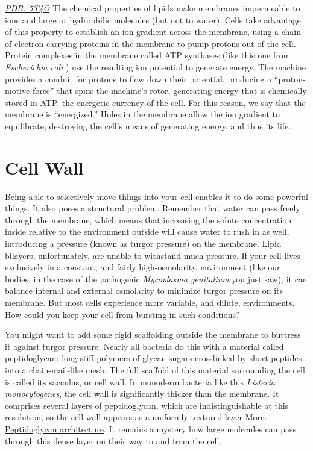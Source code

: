 \documentclass[]{tufte-book}
\begin{document}
\href{http://rcsb.org/structure/5T4O}{\emph{PDB: 5T4O}} The chemical
properties of lipids make membranes impermeable to ions and large or
hydrophilic molecules (but not to water). Cells take advantage of this
property to establish an ion gradient across the membrane, using a chain
of electron-carrying proteins in the membrane to pump protons out of the
cell. Protein complexes in the membrane called ATP synthases (like this
one from \emph{Escherichia coli} \citep{sobti2016}) use the resulting
ion potential to generate energy. The machine provides a conduit for
protons to flow down their potential, producing a ``proton-motive
force'' that spins the machine's rotor, generating energy that is
chemically stored in ATP, the energetic currency of the cell. For this
reason, we say that the membrane is ``energized.'' Holes in the membrane
allow the ion gradient to equilibrate, destroying the cell's means of
generating energy, and thus its life.

\section{Cell Wall}\label{cell-wall}

Being able to selectively move things into your cell enables it to do
some powerful things. It also poses a structural problem. Remember that
water can pass freely through the membrane, which means that increasing
the solute concentration inside relative to the environment outside will
cause water to rush in as well, introducing a pressure (known as turgor
pressure) on the membrane. Lipid bilayers, unfortunately, are unable to
withstand much pressure. If your cell lives exclusively in a constant,
and fairly high-osmolarity, environment (like our bodies, in the case of
the pathogenic \emph{Mycoplasma genitalium} you just saw), it can
balance internal and external osmolarity to minimize turgor pressure on
its membrane. But most cells experience more variable, and dilute,
environments. How could you keep your cell from bursting in such
conditions?

You might want to add some rigid scaffolding outside the membrane to
buttress it against turgor pressure. Nearly all bacteria do this with a
material called peptidoglycan: long stiff polymers of glycan sugars
crosslinked by short peptides into a chain-mail-like mesh. The full
scaffold of this material surrounding the cell is called its sacculus,
or cell wall. In monoderm bacteria like this \emph{Listeria
monocytogenes}, the cell wall is significantly thicker than the
membrane. It comprises several layers of peptidoglycan, which are
indistinguishable at this resolution, so the cell wall appears as a
uniformly textured layer
\protect\hyperlink{Peptidoglycan_architecture}{More: Peptidoglycan
architecture}. It remains a mystery how large molecules can pass through
this dense layer on their way to and from the cell.
\end{document}
